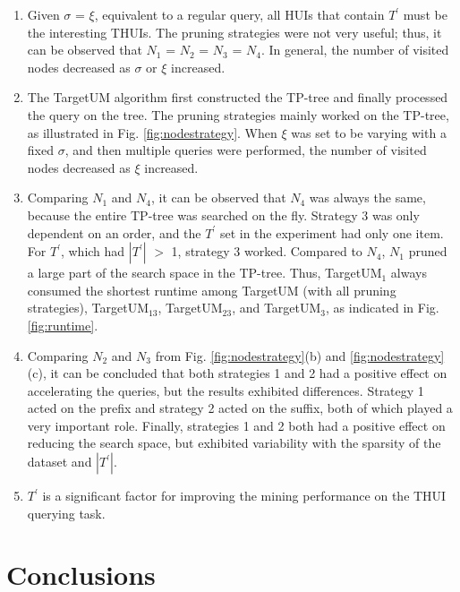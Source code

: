 \documentclass[journal]{IEEEtran}
\begin{document}
\begin{enumerate}[]
	\item Given $\sigma$ = $\xi$, equivalent to a regular query, all HUIs that contain $T^\prime$ must be the interesting THUIs. The pruning strategies were not very useful; thus, it can be observed that $N_1$ = $N_2$ = $N_3$ = $N_4$. In general, the number of visited nodes decreased as $\sigma$ or $\xi$ increased.
	
	\item The TargetUM algorithm first constructed the TP-tree and finally processed the query on the tree. The pruning strategies mainly worked on the TP-tree, as illustrated in Fig. \ref{fig:nodestrategy}. When $\xi$ was set to be varying with a fixed $\sigma$, and then multiple queries were performed, the number of visited nodes decreased as $\xi$ increased.
	
	\item Comparing $N_1$ and $N_4$, it can be observed that $N_4$ was always the same, because the entire TP-tree was searched on the fly. Strategy 3 was only dependent on an order, and the $T^\prime$ set in the experiment had only one item. For $T^\prime$, which had $|T^\prime|$ $>$ 1, strategy 3 worked. Compared to $N_4$, $N_1$ pruned a large part of the search space in the TP-tree. Thus, TargetUM$_1$ always consumed the shortest runtime among TargetUM (with all pruning strategies), TargetUM$_{13}$, TargetUM$_{23}$, and TargetUM$_3$, as indicated in Fig. \ref{fig:runtime}.
	
	\item Comparing $N_2$ and $N_3$ from Fig. \ref{fig:nodestrategy}(b) and \ref{fig:nodestrategy}(c), it can be concluded that both strategies 1 and 2 had a positive effect on accelerating the queries, but the results exhibited differences. Strategy 1 acted on the prefix and strategy 2 acted on the suffix, both of which played a very important role. Finally, strategies 1 and 2 both had a positive effect on reducing the search space, but exhibited variability with the sparsity of the dataset and $|T^\prime|$.
	
	\item $T^\prime$ is a significant factor for improving the mining performance on the THUI querying task.
\end{enumerate}



\section{Conclusions}
\label{sec:conclusion}
\end{document}
